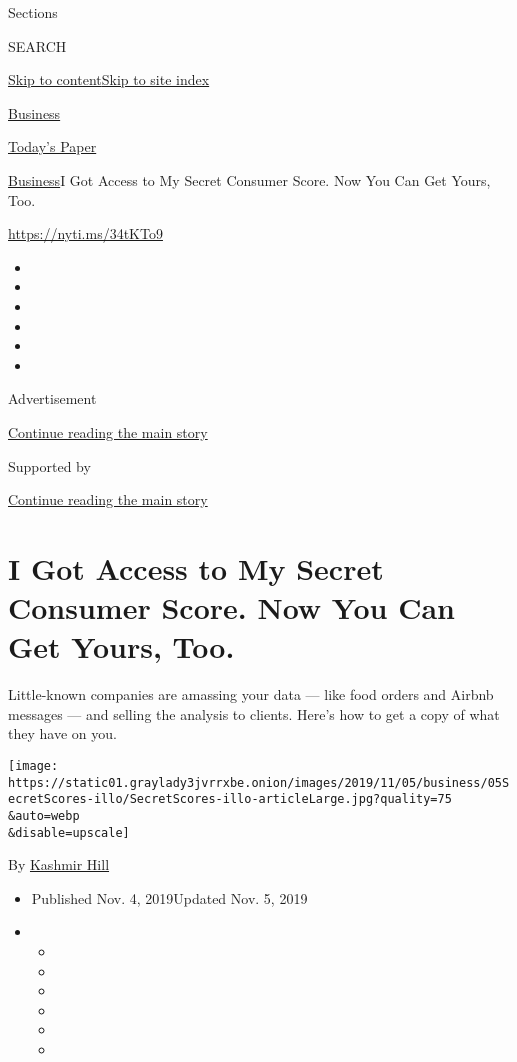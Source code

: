 Sections

SEARCH

\protect\hyperlink{site-content}{Skip to
content}\protect\hyperlink{site-index}{Skip to site index}

\href{https://www.nytimes3xbfgragh.onion/section/business}{Business}

\href{https://myaccount.nytimes3xbfgragh.onion/auth/login?response_type=cookie\&client_id=vi}{}

\href{https://www.nytimes3xbfgragh.onion/section/todayspaper}{Today's
Paper}

\href{/section/business}{Business}\textbar{}I Got Access to My Secret
Consumer Score. Now You Can Get Yours, Too.

\url{https://nyti.ms/34tKTo9}

\begin{itemize}
\item
\item
\item
\item
\item
\item
\end{itemize}

Advertisement

\protect\hyperlink{after-top}{Continue reading the main story}

Supported by

\protect\hyperlink{after-sponsor}{Continue reading the main story}

\hypertarget{i-got-access-to-my-secret-consumer-score-now-you-can-get-yours-too}{%
\section{I Got Access to My Secret Consumer Score. Now You Can Get
Yours,
Too.}\label{i-got-access-to-my-secret-consumer-score-now-you-can-get-yours-too}}

Little-known companies are amassing your data --- like food orders and
Airbnb messages --- and selling the analysis to clients. Here's how to
get a copy of what they have on you.

\texttt{[image: https://static01.graylady3jvrrxbe.onion/images/2019/11/05/business/05SecretScores-illo/SecretScores-illo-articleLarge.jpg?quality=75\\\&auto=webp\\\&disable=upscale]}

By \href{https://www.nytimes3xbfgragh.onion/by/kashmir-hill}{Kashmir
Hill}

\begin{itemize}
\item
  Published Nov. 4, 2019Updated Nov. 5, 2019
\item
  \begin{itemize}
  \item
  \item
  \item
  \item
  \item
  \item
  \end{itemize}
\end{itemize}

